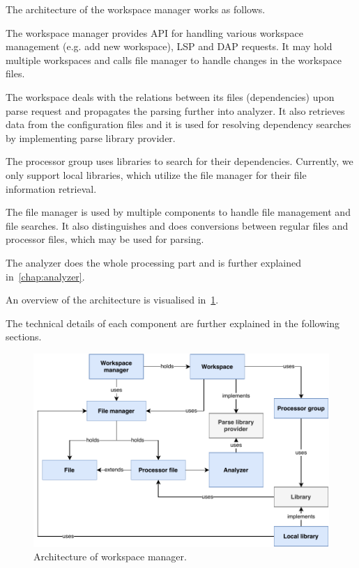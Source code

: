 The architecture of the workspace manager works as follows.

The workspace manager provides API for handling various workspace management (e.g. add new workspace), LSP and DAP requests. It may hold multiple workspaces and calls 
file manager to handle changes in the workspace files.

The workspace deals with the relations between its files (dependencies) upon parse request and propagates the parsing further into analyzer. It also retrieves data from the configuration files and it is used for resolving dependency searches by implementing parse library provider.

The processor group uses libraries to search for their dependencies. Currently, we only support local libraries, which utilize the file manager for their file information retrieval.

The file manager is used by multiple components to handle file management and file searches. It also distinguishes and does conversions between regular files and processor files, which may be used for parsing.

The analyzer does the whole processing part and is further explained in~\cref{chap:analyzer}.

An overview of the architecture is visualised in~\cref{ws_mngr_arch}.

The technical details of each component are further explained in the following sections.


\begin{landscape}
\begin{figure}
	\centering
	\includegraphics[width=16cm]{img/ws_mngr_arch}
	\caption{Architecture of workspace manager.}
	\label{ws_mngr_arch}
\end{figure}
\end{landscape}

